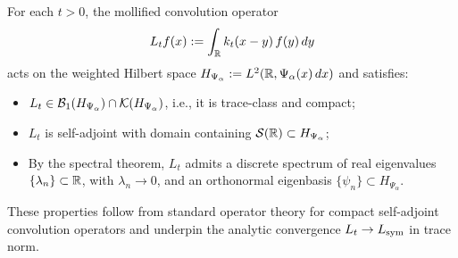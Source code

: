 \begin{remark}
\label{rmk:spectrum_Lt_real_discrete}
For each \( t > 0 \), the mollified convolution operator
\[
L_t f(x) := \int_{\mathbb{R}} k_t(x - y)\, f(y)\, dy
\]
acts on the weighted Hilbert space \( H_{\Psi_\alpha} := L^2(\mathbb{R}, \Psi_\alpha(x)\, dx) \) and satisfies:
\begin{itemize}
  \item \( L_t \in \mathcal{B}_1(H_{\Psi_\alpha}) \cap \mathcal{K}(H_{\Psi_\alpha}) \), i.e., it is trace-class and compact;
  \item \( L_t \) is self-adjoint with domain containing \( \mathcal{S}(\mathbb{R}) \subset H_{\Psi_\alpha} \);
  \item By the spectral theorem, \( L_t \) admits a discrete spectrum of real eigenvalues \( \{ \lambda_n \} \subset \mathbb{R} \), with \( \lambda_n \to 0 \), and an orthonormal eigenbasis \( \{ \psi_n \} \subset H_{\Psi_\alpha} \).
\end{itemize}

These properties follow from standard operator theory for compact self-adjoint convolution operators and underpin the analytic convergence \( L_t \to L_{\mathrm{sym}} \) in trace norm.
\end{remark}
